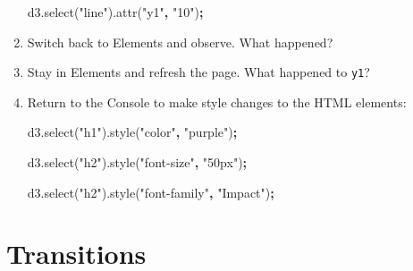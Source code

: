 \documentclass[]{book}
\newenvironment{Shaded}{\begin{snugshade}}{\end{snugshade}}
\newcommand{\AttributeTok}[1]{\textcolor[rgb]{0.77,0.63,0.00}{#1}}
\newcommand{\NormalTok}[1]{#1}
\newcommand{\OperatorTok}[1]{\textcolor[rgb]{0.81,0.36,0.00}{\textbf{#1}}}
\newcommand{\StringTok}[1]{\textcolor[rgb]{0.31,0.60,0.02}{#1}}
\newcommand{\VariableTok}[1]{\textcolor[rgb]{0.00,0.00,0.00}{#1}}
\begin{document}
\begin{enumerate}
\begin{Shaded}
\begin{Highlighting}[]
\VariableTok{d3}\NormalTok{.}\AttributeTok{select}\NormalTok{(}\StringTok{"line"}\NormalTok{).}\AttributeTok{attr}\NormalTok{(}\StringTok{"y1"}\OperatorTok{,} \StringTok{"10"}\NormalTok{)}\OperatorTok{;}
\end{Highlighting}
\end{Shaded}
\item
  Switch back to Elements and observe. What happened?
\item
  Stay in Elements and refresh the page. What happened to \texttt{y1}?
\item
  Return to the Console to make style changes to the HTML elements:

\begin{Shaded}
\begin{Highlighting}[]
\VariableTok{d3}\NormalTok{.}\AttributeTok{select}\NormalTok{(}\StringTok{"h1"}\NormalTok{).}\AttributeTok{style}\NormalTok{(}\StringTok{"color"}\OperatorTok{,} \StringTok{"purple"}\NormalTok{)}\OperatorTok{;}

\VariableTok{d3}\NormalTok{.}\AttributeTok{select}\NormalTok{(}\StringTok{"h2"}\NormalTok{).}\AttributeTok{style}\NormalTok{(}\StringTok{"font-size"}\OperatorTok{,} \StringTok{"50px"}\NormalTok{)}\OperatorTok{;}

\VariableTok{d3}\NormalTok{.}\AttributeTok{select}\NormalTok{(}\StringTok{"h2"}\NormalTok{).}\AttributeTok{style}\NormalTok{(}\StringTok{"font-family"}\OperatorTok{,} \StringTok{"Impact"}\NormalTok{)}\OperatorTok{;}
\end{Highlighting}
\end{Shaded}
\end{enumerate}

\hypertarget{transitions}{%
\section{Transitions}\label{transitions}}
\end{document}

